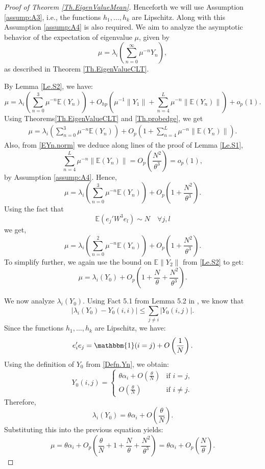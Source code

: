 \documentclass[11pt, reqno]{amsart}
\DeclareMathOperator{\one}{\mathbbm{1}} %
\numberwithin{equation}{section}
\begin{document}
\begin{proof}[Proof of Theorem \ref{Th.EigenValueMean}]
Henceforth we will use Assumption \ref{assump:A3}, i.e., the functions \( h_1,\ldots,h_k \) are Lipschitz. Along with this Assumption \ref{assump:A4} is also required. We aim to analyze the asymptotic behavior of the  expectation of eigenvalue \( \mu \), given by
\[
\mu = \lambda_i\left(\sum_{n=0}^\infty \mu^{-n} Y_n\right),
\]
as described in Theorem \ref{Th.EigenValueCLT}.

By Lemma \ref{Le.S2}, we have:
\[
\mu = \lambda_i\left(\sum_{n=0}^3 \mu^{-n} \mathbb{E}(Y_n)\right) + O_{hp}\left(\mu^{-1}\|Y_1\| + \sum_{n=4}^L \mu^{-n} \|\mathbb{E}(Y_n)\|\right) + o_{p}(1).
\]
Using Theorems\ref{Th.EigenValueCLT} and \ref{Th.probedge}, we get
\begin{align}
\label{EigenValueMean.0}\mu = \lambda_i\left(\sum_{n=0}^3 \mu^{-n} \mathbb{E}(Y_n)\right) + O_{p}\left(1 + \sum_{n=4}^L \mu^{-n} \|\mathbb{E}(Y_n)\|\right).
\end{align}
Also, from \eqref{EYn.norm} we deduce along lines of the proof of Lemma \ref{Le.S1},
\[
\sum_{n=4}^L \mu^{-n} \|\mathbb{E}(Y_n)\| = O_p\left(\frac{N^{2}}{\theta^3}\right)=o_p(1),
\]by Assumption \ref{assump:A4}.
Hence,
\begin{equation*}
\mu = \lambda_i\left(\sum_{n=0}^3 \mu^{-n} \mathbb{E}(Y_n)\right) + O_p\left(1 + \frac{N^2}{\theta^3}\right).
\end{equation*}
Using the fact that $$\mathbb E(e_j'W^3e_l) \sim N\quad \forall j,l$$ we get,
\begin{equation}
\label{Eq.EigMean.1} \mu = \lambda_i\left(\sum_{n=0}^2 \mu^{-n} \mathbb{E}(Y_n)\right) + O_p\left(1 + \frac{N^2}{\theta^3}\right).
\end{equation}
To simplify further, we again use the bound on \( \mathbb E \|Y_2\| \) from \ref{Le.S2} to get:
\[
\mu = \lambda_i(Y_0) + O_p\left(1 + \frac{N}{\theta} + \frac{N^2}{\theta^3}\right).
\]

We now analyze \( \lambda_i(Y_0) \). Using Fact 5.1 from Lemma 5.2 in \cite{chakrabarty2020eigenvalues}, we know that
\[
|\lambda_i(Y_0) - Y_0(i,i)| \le \sum_{j \ne i} |Y_0(i,j)|.
\]
Since the functions \( h_1,\ldots,h_k \) are Lipschitz, we have:
\[
e_i^\prime e_j = \one(i = j) + O\left(\frac{1}{N}\right).
\]
Using the definition of \( Y_0 \) from \eqref{Defn.Yn}, we obtain:
\[
Y_0(i,j) = 
\begin{cases}
\theta\alpha_i + O\left(\frac{\theta}{N}\right) & \text{if } i = j, \\
O\left(\frac{\theta}{N}\right) & \text{if } i \ne j.
\end{cases}
\]
Therefore,
\begin{equation}
\label{EigenValueMean.6}\lambda_i(Y_0) = \theta\alpha_i + O\left(\frac{\theta}{N}\right).
\end{equation}
Substituting this into the previous equation yields:
\[
\mu = \theta\alpha_i + O_p\left(\frac{\theta}{N} + 1 + \frac{N}{\theta} + \frac{N^2}{\theta^3}\right) = \theta\alpha_i + O_p\left(\frac{N}{\theta}\right).
\]


\end{proof}
\end{document}
